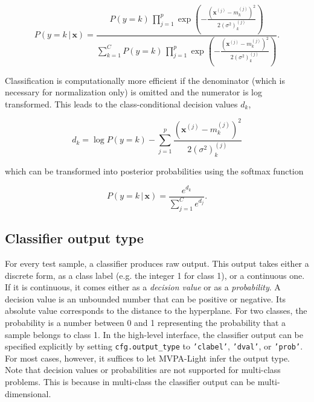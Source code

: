 \documentclass[utf8]{frontiersSCNS} %
\newcommand{\mf}[2]{m_#1^{(#2)}}
\newcommand{\sig}[2]{(\sigma^2)_#1^{(#2)}}
\newcommand{\x}{\mathbf{x}}
\newcommand{\xf}[1]{\mathbf{x}^{(#1)}} %
\newcommand{\ttt}[1]{\texttt{#1}}
\begin{document}
\begin{equation}
\label{eq:naive_bayes_gaussian}
P(y = k\,|\,\x) = \frac{P(y = k)\,\prod_{j=1}^p \exp(-\frac{(\xf{j} - \mf{k}{j})^2}{2\sig{k}{j}})}%
{\sum_{k=1}^C P(y = k)\,\prod_{j=1}^p \exp(-\frac{(\xf{j} - \mf{k}{j})^2}{2\sig{k}{j}})}.
\end{equation}

Classification is computationally more efficient if the denominator (which is necessary for normalization only) is omitted and the numerator is log transformed. This leads to the class-conditional decision values $d_k$,

\begin{equation}
\label{eq:naive_bayes_dval}
d_k = \log P(y = k) - \sum_{j=1}^p \frac{(\xf{j} - \mf{k}{j})^2}{2\sig{k}{j}}
\end{equation}

which can be transformed into posterior probabilities using the softmax function 

\begin{equation}
\label{eq:naive_bayes_softmax}
P(y = k\,|\,\x) = \frac{e^{d_k}}{\sum_{j=1}^C e^{d_j}}.
\end{equation}

\subsection{Classifier output type}\label{sec:output}

For every test sample, a classifier produces raw output. This output takes either a discrete form, as a class label (e.g. the integer 1 for class 1), or a continuous one. If it is continuous, it comes either as a \textit{decision value} or as a \textit{probability}. A decision value is an unbounded number that can be positive or negative. Its absolute value corresponds to the distance to the hyperplane. For two classes, the probability is a number between 0 and 1 representing the probability that a sample belongs to class 1. 
In the high-level interface, the classifier output can be specified explicitly by setting \ttt{cfg.output\_type} to \ttt{'clabel'}, \ttt{'dval'}, or \ttt{'prob'}. For most cases, however, it suffices to let MVPA-Light infer the output type. Note that decision values or probabilities are not supported for multi-class problems. This is because in multi-class the classifier output can be multi-dimensional. 
\end{document}
